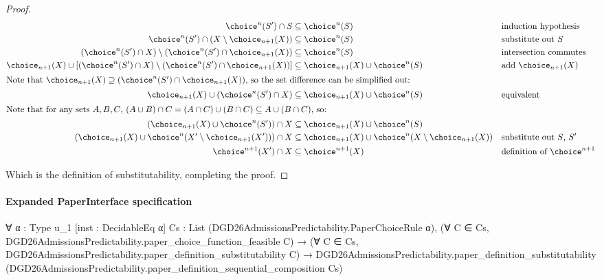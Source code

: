 \documentclass[10pt]{article}
\begin{document}
\begin{ReviewVerbatim}
\begin{proof}
    \begin{align*}
        \choice^n(S') \cap S & \subseteq \choice^n(S) && \text{induction hypothesis} \\
        \choice^n(S') \cap \left(X \setminus \choice_{n+1}(X)\right) & \subseteq \choice^n(S) &&  \text{substitute out $S$}\\      \left(\choice^n(S') \cap X\right) \setminus \left(\choice^n(S') \cap  \choice_{n+1}(X)\right) & \subseteq \choice^n(S) && \text{intersection commutes}\\
        \choice_{n+1}(X) \cup \left[\left(\choice^n(S') \cap X\right) \setminus \left(\choice^n(S') \cap  \choice_{n+1}(X)\right)\right] & \subseteq \choice_{n+1}(X) \cup \choice^n(S) && \text{add $\choice_{n+1}(X)$} \\ \intertext{Note that $\choice_{n+1}(X) \supseteq\left(\choice^n(S') \cap  \choice_{n+1}(X)\right)$, so the set difference can be simplified out:}
        \choice_{n+1}(X) \cup \left(\choice^n(S') \cap X\right) & \subseteq \choice_{n+1}(X) \cup \choice^n(S) && \text{equivalent} \\ \intertext{Note that for any sets $A,B,C$, $(A \cup B) \cap C = (A \cap C)\cup (B \cap C) \subseteq A \cup (B \cap C)$, so:
        }
        \left(\choice_{n+1}(X) \cup \choice^n(S') \right) \cap X & \subseteq \choice_{n+1}(X) \cup \choice^n(S) && \text{} \\
        \left(\choice_{n+1}(X) \cup \choice^n(X' \setminus \choice_{n+1}(X')) \right) \cap X & \subseteq \choice_{n+1}(X) \cup \choice^n(X \setminus \choice_{n+1}(X)) &&  \text{substitute out $S$, $S'$}  \\
        \choice^{n+1}(X') \cap X & \subseteq \choice^{n+1}(X) &&  \text{definition of $\choice^{n+1}$}
    \end{align*}

    Which is the definition of substitutability, completing the proof.
\end{proof}
\end{ReviewVerbatim}


\paragraph{Expanded PaperInterface specification}
\begin{ReviewVerbatim}
∀ {α : Type u_1} [inst : DecidableEq α] {Cs : List (DGD26AdmissionsPredictability.PaperChoiceRule α)},
  (∀ C ∈ Cs, DGD26AdmissionsPredictability.paper_choice_function_feasible C) →
    (∀ C ∈ Cs, DGD26AdmissionsPredictability.paper_definition_substitutability C) →
      DGD26AdmissionsPredictability.paper_definition_substitutability
        (DGD26AdmissionsPredictability.paper_definition_sequential_composition Cs)
\end{ReviewVerbatim}
\end{document}
